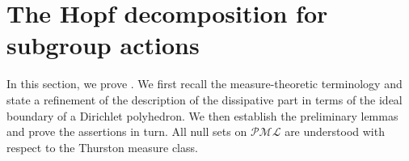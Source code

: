 \documentclass[dvipdfmx]{amsart}
\newtheorem{lemma}{Lemma}[section]
\theoremstyle{remark}
\newcommand{\ext}{{\rm Ext}}
\newcommand{\PThursM}{\hat{\mu}_{Th}}
\newcommand{\ray}{{\boldsymbol r}}
\newcommand{\pml}{\mathcal{PML}}
\newcommand{\busemann}{\boldsymbol{b}}
\newcommand{\Dirichlet}{\mathscr{D}}
\newcommand{\horos}{\mathscr{H}}
\begin{document}








\section{The Hopf decomposition for subgroup actions}
\label{sec:Hopf_decomposition}
In this section, we prove .
We first recall the measure-theoretic terminology and state a refinement
of the description of the dissipative part in terms of the ideal boundary
of a Dirichlet polyhedron. We then establish the preliminary lemmas and
prove the assertions in turn. All null sets on $\pml$ are understood
with respect to the Thurston measure class.
\end{document}
